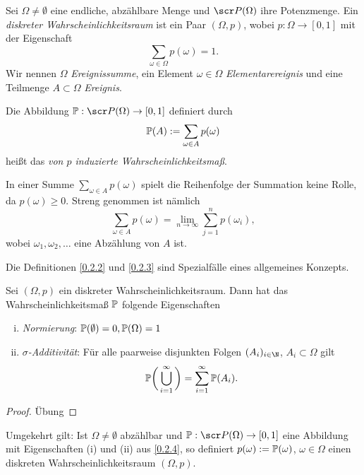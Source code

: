 \begin{df} \label{0.2.2}
	Sei $\Omega \neq \emptyset$ eine endliche, abzählbare Menge und $\scr P(\Omega)$ ihre Potenzmenge.
	Ein \emph{diskreter Wahrscheinlichkeitsraum} ist ein Paar $(\Omega, p)$, wobei $p: \Omega \to [0,1]$ mit der Eigenschaft
	\[
		\sum_{\omega \in \Omega} p(\omega) = 1.
	\]
	Wir nennen $\Omega$ \emph{Ereignissumme}, ein Element $\omega \in \Omega$ \emph{Elementarereignis} und eine Teilmenge $A \subset \Omega$ \emph{Ereignis}.
\end{df}

\begin{df} \label{0.2.3}
	Die Abbildung $\P : \scr P(\Omega) \to [0,1]$ definiert durch
	\[
		\P(A) := \sum_{\omega \in A} p(\omega)
	\]
	heißt das \emph{von $p$ induzierte Wahrscheinlichkeitsmaß}.
\end{df}

\begin{nt*}
	In einer Summe $\sum_{\omega \in A} p(\omega)$ spielt die Reihenfolge der Summation keine Rolle, da $p(\omega) \ge 0$.
	Streng genommen ist nämlich
	\[
		\sum_{\omega \in A} p(\omega)
		= \lim_{n\to \infty} \sum_{j=1}^n p(\omega_i),
	\]
	wobei $\omega_1, \omega_2, \dotsc$ eine Abzählung von $A$ ist.
\end{nt*}

Die Definitionen \ref{0.2.2} und \ref{0.2.3} sind Spezialfälle eines allgemeines Konzepts.

\begin{nt} \label{0.2.4}
	Sei $(\Omega, p)$ ein diskreter Wahrscheinlichkeitsraum.
	Dann hat das Wahrscheinlichkeitsmaß $\P$ folgende Eigenschaften
	\begin{enumerate}[(i)]
		\item
			\emph{Normierung}:
			$\P(\emptyset) = 0, \P(\Omega) = 1$
		\item
			\emph{$\sigma$-Additivität}:
			Für alle paarweise disjunkten Folgen $(A_i)_{i \in \N}$, $A_i \subset \Omega$ gilt
			\[
				\P \bigg( \bigcup_{i=1}^\infty \bigg) = \sum_{i=1}^\infty \P(A_i).
			\]
	\end{enumerate}
	\begin{proof}
		Übung
	\end{proof}
\end{nt}

\begin{nt} \label{0.2.5}
	Umgekehrt gilt:
	Ist $\Omega \neq \emptyset$ abzählbar und $\P : \scr P(\Omega) \to [0,1]$ eine Abbildung mit Eigenschaften (i) und (ii) aus \ref{0.2.4}, so definiert $p(\omega) := \P({\omega})$, $\omega \in \Omega$ einen diskreten Wahrscheinlichkeitsraum $(\Omega, p)$.
\end{nt}

